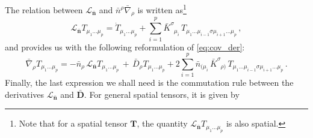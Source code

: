 \documentclass[notitlepage,onecolumn,floatfix,preprintnumbers,aps,prd,showpacs,nofootinbib,amsmath,amssymb,amsfonts]{revtex4-1}
\newcommand{\Lie}{\mathcal{L}}
\newcommand{\be}{\begin{equation}}
\newcommand{\ee}{\end{equation}}
\newcommand{\gr}[1]{{\bm #1}}
\newcommand{\<}{\langle}
\renewcommand{\>}{\rangle}
\begin{document}
The relation between $\Lie_{\bm{\bar n}}$ and $\bar n^\rho \bar \nabla_\rho$ is written as\footnote{%
%
Note that for a spatial tensor $\bm T$, the quantity $\Lie_{\bm{\bar n}} T_{\mu_1 \dots \mu_p}$ is also spatial. 
%
} 
%
%
\be
	\Lie_{\bm{\bar n}}  T_{\mu_1 \dots \mu_p} 
		= \dot{T}_{\mu_1 \dots \mu_p} 
		+ \sum_{i=1}^{p} \bar K^{\sigma}_{\phantom{\sigma} \mu_i} \, T_{\mu_1 \dots \mu_{i-1} \sigma \mu_{i+1} \dots \mu_p} \, , 
	\label{eq:lie_dot_relat}
\ee
and provides us with the following reformulation of \eqref{eq:cov_der}: 
%
%
\be
	\bar \nabla_\rho  T_{\mu_1 \dots \mu_p} 
		= - \bar n_\rho \, \Lie_{\bm{\bar n}} T_{\mu_1 \dots \mu_p} \, + \, \bar D_\rho T_{\mu_1 \dots \mu_p} 
		+ 2 \sum_{i=1}^{p} \bar n_{(\mu_i} \, \bar K^{\sigma}_{\phantom{\sigma} \rho)} \, T_{\mu_1 \dots \mu_{i-1} \sigma \mu_{i+1} \dots \mu_p} \, . 
	\label{eq:CDTocd}
\ee
Finally, the last expression we shall need is the commutation rule between the derivatives $\Lie_{\bm{\bar n}}$ and $\bar{\bm D}$. 
For general spatial 
%
%
tensors, it is given by 
\end{document}
